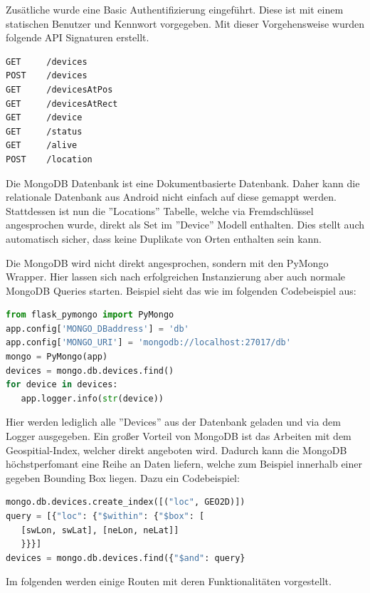 \documentclass[11pt,a4paper]{article}
\begin{document}
\noindent Zusätliche wurde eine Basic Authentifizierung eingeführt. Diese ist mit einem statischen Benutzer und Kennwort vorgegeben.
Mit dieser Vorgehensweise wurden folgende API Signaturen erstellt. 

\begin{lstlisting}[]
GET     /devices
POST	/devices
GET     /devicesAtPos
GET     /devicesAtRect
GET     /device
GET     /status
GET     /alive
POST    /location
\end{lstlisting}

Die MongoDB Datenbank ist eine Dokumentbasierte Datenbank. Daher kann die relationale Datenbank aus Android nicht einfach auf diese gemappt werden. Stattdessen ist nun die ''Locations'' Tabelle, welche via Fremdschlüssel angesprochen wurde, direkt als Set im ''Device'' Modell enthalten. Dies stellt auch automatisch sicher, dass keine Duplikate von Orten enthalten sein kann.

Die MongoDB wird nicht direkt angesprochen, sondern mit den PyMongo Wrapper. Hier lassen sich nach erfolgreichen Instanzierung aber auch normale MongoDB Queries starten. Beispiel sieht das wie im folgenden Codebeispiel aus:

\begin{lstlisting}[language=Python]
from flask_pymongo import PyMongo
app.config['MONGO_DBaddress'] = 'db'
app.config['MONGO_URI'] = 'mongodb://localhost:27017/db'
mongo = PyMongo(app)
devices = mongo.db.devices.find()
for device in devices:
   app.logger.info(str(device))
\end{lstlisting}

Hier werden lediglich alle ''Devices'' aus der Datenbank geladen und via dem Logger ausgegeben. 
Ein großer Vorteil von MongoDB ist das Arbeiten mit dem Geospitial-Index, welcher direkt angeboten wird. Dadurch kann die MongoDB höchstperfomant eine Reihe an Daten liefern, welche zum Beispiel innerhalb einer gegeben Bounding Box liegen. Dazu ein Codebeispiel:

\begin{lstlisting}[language=Python]
mongo.db.devices.create_index([("loc", GEO2D)])
query = [{"loc": {"$within": {"$box": [
   [swLon, swLat], [neLon, neLat]]
   }}}]
devices = mongo.db.devices.find({"$and": query}
\end{lstlisting}


\newpage
\noindent
Im folgenden werden einige Routen mit deren Funktionalitäten vorgestellt.
\end{document}
